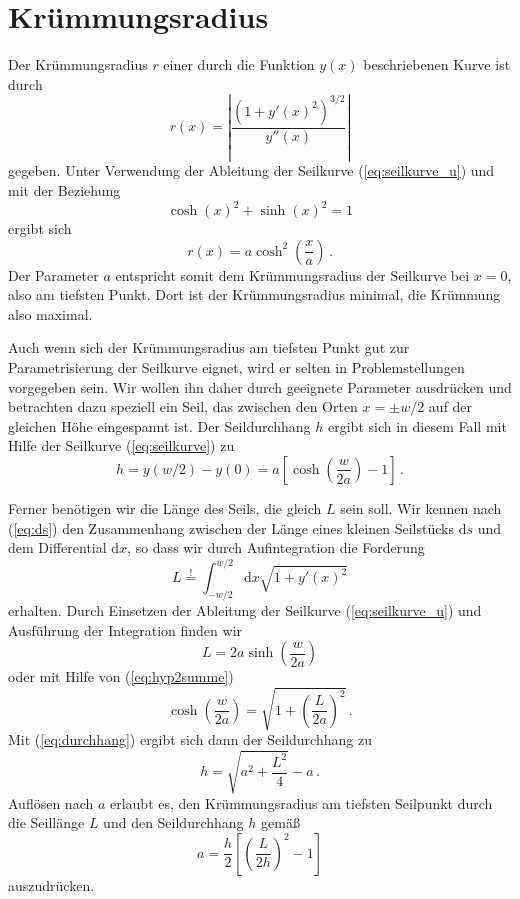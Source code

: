 \documentclass[twocolumn,nobalancelastpage]{revtex4}
\begin{document}
\section{Krümmungsradius}
Der Krümmungsradius $r$ einer durch die Funktion $y(x)$ beschriebenen
Kurve ist durch
\begin{equation}
 r(x) = \left\vert\frac{(1+y'(x)^2)^{3/2}}{y''(x)}\right\vert
\end{equation}
gegeben. Unter Verwendung der Ableitung der Seilkurve
(\ref{eq:seilkurve_u}) und mit der Beziehung
\begin{equation}
 \cosh(x)^2+\sinh(x)^2 = 1
 \label{eq:hyp2summe}
\end{equation}
ergibt sich
\begin{equation}
 r(x) = a\cosh^2\left(\frac{x}{a}\right)\,.
\end{equation}
Der Parameter $a$ entspricht somit dem Krümmungsradius der Seilkurve
bei $x=0$, also am tiefsten Punkt. Dort ist der Krümmungsradius
minimal, die Krümmung also maximal.

Auch wenn sich der Krümmungsradius am tiefsten Punkt gut zur
Parametrisierung der Seilkurve eignet, wird er selten in
Problemstellungen vorgegeben sein. Wir wollen ihn daher durch
geeignete Parameter ausdrücken und betrachten dazu speziell ein
Seil, das zwischen den Orten $x=\pm w/2$ auf der gleichen Höhe
eingespannt ist. Der Seildurchhang $h$ ergibt sich in diesem Fall mit
Hilfe der Seilkurve (\ref{eq:seilkurve}) zu
\begin{equation}
 h = y(w/2)-y(0) = a\left[\cosh\left(\frac{w}{2a}\right)-1\right]\,.
 \label{eq:durchhang}
\end{equation}

Ferner benötigen wir die Länge des Seils, die gleich $L$ sein soll.
Wir kennen nach (\ref{eq:ds}) den Zusammenhang zwischen der Länge
eines kleinen Seilstücks $\mathrm{d}s$ und dem Differential
$\mathrm{d}x$, so dass wir durch Auf\/integration die Forderung
\begin{equation}
 L \overset{!}{=} \int_{-w/2}^{w/2}\mathrm{d}x\sqrt{1+y'(x)^2}
\end{equation}
erhalten. Durch Einsetzen der Ableitung der Seilkurve
(\ref{eq:seilkurve_u}) und Ausführung der Integration finden wir
\begin{equation}
 L = 2a\sinh\left(\frac{w}{2a}\right)
\end{equation}
oder mit Hilfe von (\ref{eq:hyp2summe})
\begin{equation}
 \cosh\left(\frac{w}{2a}\right) = \sqrt{1+\left(\frac{L}{2a}\right)^2}\,.
\end{equation}
Mit (\ref{eq:durchhang}) ergibt sich dann der Seildurchhang zu
\begin{equation}
 h = \sqrt{a^2+\frac{L^2}{4}}-a\,.
\end{equation}
Auf\/lösen nach $a$ erlaubt es, den Krümmungsradius am tiefsten
Seilpunkt durch die Seillänge $L$ und den Seildurchhang $h$ gemäß
\begin{equation}
 a = \frac{h}{2}\left[\left(\frac{L}{2h}\right)^2-1\right]
 \label{eq:zusammenhang_a_l_h}
\end{equation}
auszudrücken.
\end{document}
